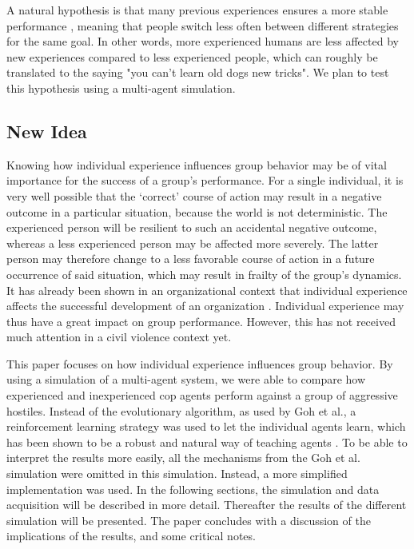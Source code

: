 A natural hypothesis is that many previous experiences ensures a more stable performance \citep{anderson2007mind,nason2005soar}, meaning that people switch less often between different strategies for the same goal. In other words, more experienced humans are less affected by new experiences compared to less experienced people, which can roughly be translated to the saying "you can't learn old dogs new tricks". We plan to test this hypothesis using a multi-agent simulation.

\subsection{New Idea}
Knowing how individual experience influences group behavior may be of vital importance for the success of a group's performance.
For a single individual, it is very well possible that the `correct' course of action may result in a negative outcome in a particular situation, because the world is not deterministic.
The experienced person will be resilient to such an accidental negative outcome, whereas a less experienced person may be affected more severely.
The latter person may therefore change to a less favorable course of action in a future occurrence of said situation, which may result in frailty of the group's dynamics.
It has already been shown in an organizational context that individual experience affects the successful development of an organization \citep*{reagans2005individual}.
Individual experience may thus have a great impact on group performance.
However, this has not received much attention in a civil violence context yet.

This paper focuses on how individual experience influences group behavior.
 By using a simulation of a multi-agent system, we were able to compare how experienced and inexperienced cop agents perform against a group of aggressive hostiles. Instead of the evolutionary algorithm, as used by Goh et al., a reinforcement learning strategy was used to let the individual agents learn, which has been shown to be a robust and natural way of teaching agents \citep{claus1998dynamics}. To be able to interpret the results more easily, all the mechanisms from the Goh et al. simulation were omitted in this simulation. Instead, a more simplified implementation was used. In the following sections, the simulation and data acquisition will be described in more detail.
 Thereafter the results of the different simulation will be presented.
 The paper concludes with a discussion of the implications of the results, and some critical notes.
 
